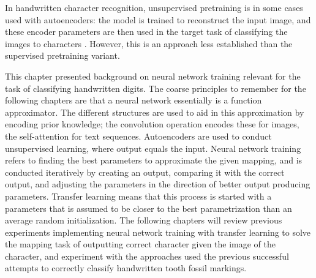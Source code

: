 \documentclass{article}
\begin{document}
In handwritten character recognition, unsupervised pretraining is in some cases used 
with autoencoders: the model is trained to reconstruct the input image, and these encoder parameters
are then used in the target task of classifying the images to characters \cite{6shoponBangla}.
However, this is an approach less established than the supervised pretraining variant.

This chapter presented background on neural network training relevant for the task 
of classifying handwritten digits. The coarse principles to remember for the following chapters 
are that a neural network essentially is a function approximator. The different structures are 
used to aid in this approximation by encoding prior knowledge; the convolution operation encodes these 
for images, the self-attention for text sequences. Autoencoders are used to conduct unsupervised
learning, where output equals the input. Neural network training refers to finding the best 
parameters to approximate the given mapping, and is conducted iteratively by creating 
an output, comparing it with the correct output, and adjusting the parameters in the direction 
of better output producing parameters. Transfer learning means that this process is started with a 
 parameters that is assumed to be closer to the best parametrization than an average 
random initialization. The following chapters will review previous experiments implementing 
neural network training with transfer learning to solve the mapping task of outputting correct character 
given the image of the character, and experiment with the approaches used the previous successful 
attempts to correctly classify handwritten tooth fossil markings.
\end{document}
